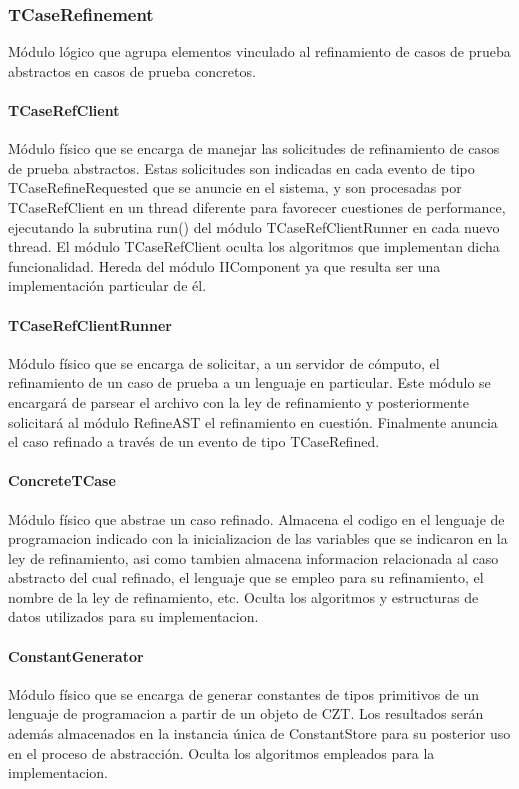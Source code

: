 \documentclass[a4paper,10pt]{report}
\begin{document}
			\subsubsection{TCaseRefinement}
			Módulo lógico que agrupa elementos vinculado al refinamiento de casos de prueba abstractos en casos de prueba concretos.
				\paragraph{TCaseRefClient}
				Módulo físico que se encarga de manejar las solicitudes de refinamiento de casos de prueba abstractos. Estas solicitudes son indicadas en cada evento de tipo TCaseRefineRequested que se anuncie en el sistema, y son procesadas por TCaseRefClient en un thread diferente para favorecer cuestiones de performance, ejecutando la subrutina run() del módulo TCaseRefClientRunner en cada nuevo thread. El módulo TCaseRefClient oculta los algoritmos que implementan dicha funcionalidad. Hereda del módulo IIComponent ya que resulta ser una implementación particular de él.
				\paragraph{TCaseRefClientRunner}
				Módulo físico que se encarga de solicitar, a un servidor de cómputo, el refinamiento de un caso de prueba a un lenguaje en particular. Este módulo se encargará de parsear el archivo con la ley de refinamiento y posteriormente solicitará al módulo RefineAST el refinamiento en cuestión. Finalmente anuncia el caso refinado a través de un evento de tipo TCaseRefined.
				\paragraph{ConcreteTCase}
				Módulo físico que abstrae un caso refinado. Almacena el codigo en el lenguaje de programacion indicado con la inicializacion de las variables que se indicaron en la ley de refinamiento, asi como tambien almacena informacion relacionada al caso abstracto del cual refinado, el lenguaje que se empleo para su refinamiento, el nombre de la ley de refinamiento, etc. Oculta los algoritmos y estructuras de datos utilizados para su implementacion. 
				\paragraph{ConstantGenerator}
				Módulo físico que se encarga de generar constantes de tipos primitivos de un lenguaje de programacion a partir de un objeto de CZT. Los resultados serán además almacenados en la instancia única de ConstantStore para su posterior uso en el proceso de abstracción.
				Oculta los algoritmos empleados para la implementacion.
\end{document}
